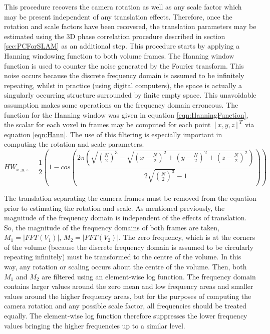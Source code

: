 This procedure recovers the camera rotation as well as any scale factor which may be present independent of any translation effects. Therefore, once the rotation and scale factors have been recovered, the translation parameters may be estimated using the 3D phase correlation procedure described in section \ref{sec:PCForSLAM} as an additional step. This procedure starts by applying a Hanning windowing function to both volume frames. The Hanning window function is used to counter the noise generated by the Fourier transform. This noise occurs because the discrete frequency domain is assumed to be infinitely repeating, whilst in practice (using digital computers), the space is actually a singularly occurring structure surrounded by finite empty space. This unavoidable assumption makes some operations on the frequency domain erroneous. The function for the Hanning window was given in equation \ref{eqn:HanningFunction}, the scalar for each voxel in frames may be computed for each point $[x,y,z]^T$ via equation \ref{eqn:Hann}. The use of this filtering is especially important in computing the rotation and scale parameters. \\


\begin{equation} \label{eqn:Hann}
\scriptstyle
HW_{x,y,z} = \frac{1}{2}\left(
1 - cos \left(
\frac{2\pi
\left(
\sqrt{\left(\frac{N}{2}\right)^3} -
\sqrt{
\left(x-\frac{N}{2}\right)^2 + \left(y-\frac{N}{2}\right)^2 + \left(z-\frac{N}{2}\right)^2
}
\right)
}
{2\sqrt{\left(\frac{N}{2}\right)^3} - 1}
\right)
\right)
\end{equation}

The translation separating the camera frames must be removed from the equation prior to estimating the rotation and scale. As mentioned previously, the magnitude of the frequency domain is independent of the effects of translation. So, the magnitude of the frequency domains of both frames are taken, $M_1 = |FFT(V_1)|$, $M_2 = |FFT(V_2)|$. The zero frequency, which is at the corners of the volume (because the discrete frequency domain is assumed to be circularly repeating infinitely) must be transformed to the centre of the volume. In this way, any rotation or scaling occurs about the centre of the volume. Then, both $M_1$ and $M_2$ are filtered using an element-wise log function. The frequency domain contains larger values around the zero mean and low frequency areas and smaller values around the higher frequency areas, but for the purposes of computing the camera rotation and any possible scale factor, all frequencies should be treated equally. The element-wise log function therefore suppresses the lower frequency values bringing the higher frequencies up to a similar level. \\

